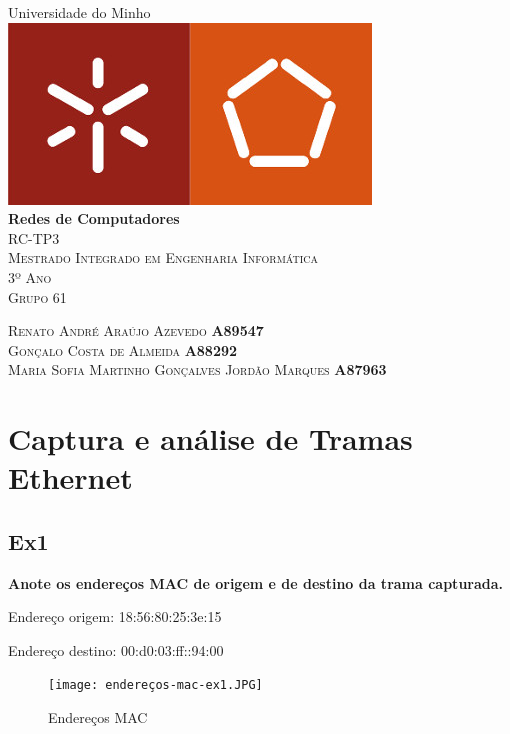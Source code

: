 \documentclass{article}
\begin{document}
\begin{capa}
	\begin{center}
	\vspace*{1.0cm}
	\huge{Universidade do Minho}\\
	[1.0cm]
	\includegraphics{logo.jpg}\\
	[1.5cm]
	\huge{\textbf{Redes de Computadores}}\\
	[0.5cm]
	\textsc{RC-TP3}\\
	\textsc{\normalsize{Mestrado Integrado em Engenharia Informática}}\\
	\textsc{\normalsize{3º Ano}}\\
	\textsc{\normalsize{Grupo 61}}\\
	[12.0cm]
	\end{center}
	\begin{flushleft}
	\textsc{Renato André Araújo Azevedo \textbf{\hspace*{130pt} A89547}}\\
	\textsc{Gonçalo Costa de Almeida \textbf{\hspace*{151pt} A88292}}\\
	\textsc{Maria Sofia Martinho Gonçalves Jordão Marques \textbf{\hspace*{30pt} A87963}}\\
	\end{flushleft}
\end{capa}

\newpage
\tableofcontents
\newpage

\section{Captura e análise de Tramas Ethernet}
\subsection{Ex1}
\textbf{Anote os endereços MAC de origem e de destino da trama capturada.}\\\par
Endereço origem: 18:56:80:25:3e:15\par
Endereço destino: 00:d0:03:ff::94:00
\begin{figure}[h]
	\centering
	\texttt{[image: endereços-mac-ex1.JPG]}
	\caption{Endereços MAC}
\end{figure}
\end{document}
